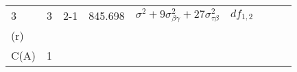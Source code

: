 \documentclass[12pt,]{article}
\begin{document}
\begin{longtable}[]{@{}lllllllll@{}}
\begin{minipage}[t]{0.03\columnwidth}
3\strut
\end{minipage} & \begin{minipage}[t]{0.03\columnwidth}\raggedright
3\strut
\end{minipage} & \begin{minipage}[t]{0.12\columnwidth}\raggedright
2-1\strut
\end{minipage} & \begin{minipage}[t]{0.15\columnwidth}\raggedright
845.698\strut
\end{minipage} & \begin{minipage}[t]{0.21\columnwidth}\raggedright
\(\sigma^2+9\sigma^2_{\beta\gamma}+27\sigma^2_{\tau\beta}\)\strut
\end{minipage} & \begin{minipage}[t]{0.09\columnwidth}\raggedright
\(df_{1,2}\)\strut
\end{minipage}\tabularnewline
\begin{minipage}[t]{0.06\columnwidth}\raggedright
(r)\strut
\end{minipage} & \begin{minipage}[t]{0.03\columnwidth}\raggedright
\strut
\end{minipage} & \begin{minipage}[t]{0.03\columnwidth}\raggedright
\strut
\end{minipage} & \begin{minipage}[t]{0.03\columnwidth}\raggedright
\strut
\end{minipage} & \begin{minipage}[t]{0.03\columnwidth}\raggedright
\strut
\end{minipage} & \begin{minipage}[t]{0.12\columnwidth}\raggedright
\strut
\end{minipage} & \begin{minipage}[t]{0.15\columnwidth}\raggedright
\strut
\end{minipage} & \begin{minipage}[t]{0.21\columnwidth}\raggedright
\strut
\end{minipage} & \begin{minipage}[t]{0.09\columnwidth}\raggedright
\strut
\end{minipage}\tabularnewline
\begin{minipage}[t]{0.06\columnwidth}\raggedright
C(A)\strut
\end{minipage} & \begin{minipage}[t]{0.03\columnwidth}\raggedright
1\strut
\end{minipage} & \begin{minipage}[t]{0.03\columnwidth}\raggedright

\end{minipage}
\end{longtable}
\end{document}
